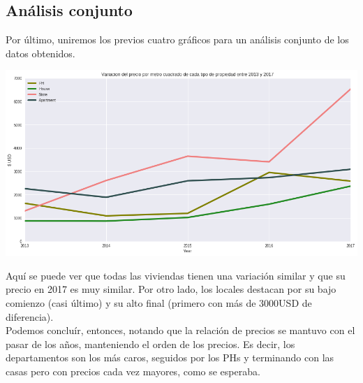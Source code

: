 \documentclass[a4paper, 10pt]{article}
\newcommand\tab[1][0.5cm]{\hspace*{#1}}
\begin{document}
			\subsection{Análisis conjunto}
				Por último, uniremos los previos cuatro gráficos para un análisis conjunto de los datos obtenidos.
				\begin{center}
   		    			\includegraphics[width=\textwidth]{images/jointVariation}
				\end{center}
				\tab Aquí se puede ver que todas las viviendas tienen una variación similar y que su precio en 2017 es muy similar.
				Por otro lado, los locales destacan por su bajo comienzo (casi último) y su alto final (primero con más de $3000$USD
				de diferencia). \\
				\tab Podemos concluír, entonces, notando que la relación de precios se mantuvo con el pasar de los años, manteniendo
				el orden de los precios. Es decir, los departamentos son los más caros, seguidos por los PHs y terminando con 
				las casas pero con precios cada vez mayores, como se esperaba.
		
\end{document}
